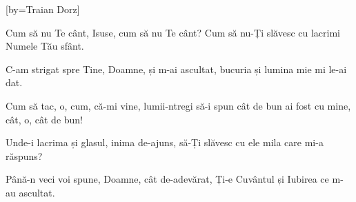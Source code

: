 
[by={Traian Dorz}]

\beginverse
Cum să nu Te cânt, Isuse,
cum să nu Te cânt?
Cum să nu-Ți slăvesc cu lacrimi
Numele Tău sfânt.
\endverse

\beginchorus
C-am strigat spre Tine, Doamne,
și m-ai ascultat,
bucuria și lumina
mie mi le-ai dat.
\endchorus

\beginverse
Cum să tac, o, cum,
că-mi vine, lumii-ntregi să-i spun
cât de bun ai fost cu mine,
cât, o, cât de bun!
\endverse

\beginverse
Unde-i lacrima și glasul,
inima de-ajuns,
să-Ți slăvesc cu ele mila
care mi-a răspuns?
\endverse

\beginverse
Până-n veci voi spune, Doamne,
cât de-adevărat,
Ți-e Cuvântul și Iubirea
ce m-au ascultat.
\endverse

\endsong
